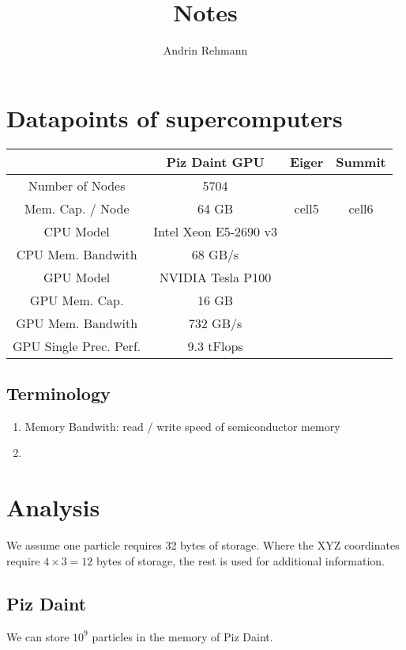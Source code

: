 \documentclass[]{article}
\title{Notes}
\author{Andrin Rehmann}
\begin{document}
\maketitle

\section{Datapoints of supercomputers}

\begin{center}
	\begin{tabular}{ c c c c }
		& Piz Daint GPU \cite{piz_daint} & Eiger & Summit \\ 
		\hline
		Number of Nodes & 5704 & & \\
		Mem. Cap. / Node & 64 GB & cell5 & cell6 \\   
		CPU Model & Intel Xeon E5-2690 v3 \\
		CPU Mem. Bandwith  & 68 GB/s \\
		GPU Model & NVIDIA Tesla P100 \\
		GPU Mem. Cap. & 16 GB \\
		GPU Mem. Bandwith & 732 GB/s \\
		GPU Single Prec. Perf. & 9.3 tFlops
	\end{tabular}
\end{center}

\subsection{Terminology}

\begin{enumerate}
	\item Memory Bandwith: read / write speed of semiconductor memory
	\item 

\end{enumerate}

\section{Analysis}


We assume one particle requires 32 bytes of storage. Where the XYZ coordinates require $4\times3 = 12$ bytes of storage, the rest is used for additional information.

\subsection{Piz Daint} 
We can store $10^9$ particles in the memory of Piz Daint. 


\end{document}
